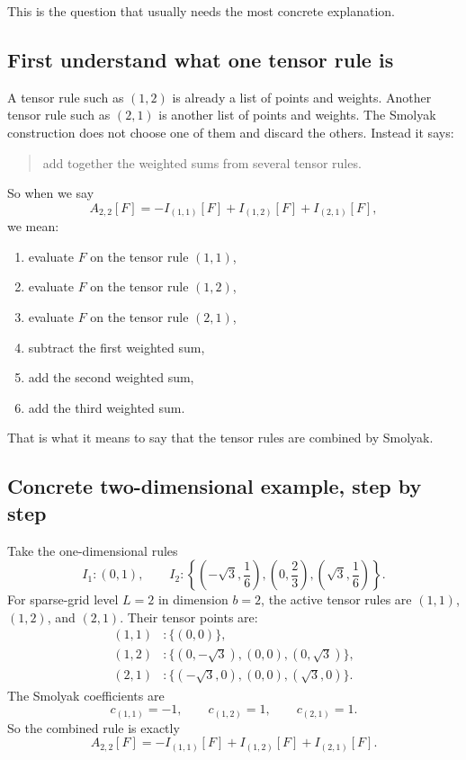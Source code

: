 \documentclass[11pt]{article}
\begin{document}
This is the question that usually needs the most concrete explanation.

\subsection{First understand what one tensor rule is}

A tensor rule such as \((1,2)\) is already a list of points and weights.
Another tensor rule such as \((2,1)\) is another list of points and weights.
The Smolyak construction does not choose one of them and discard the others.
Instead it says:
\begin{quote}
add together the weighted sums from several tensor rules.
\end{quote}

So when we say
\begin{equation}
  A_{2,2}[F] = -I_{(1,1)}[F] + I_{(1,2)}[F] + I_{(2,1)}[F],
  \label{eq:2d-smolyak}
\end{equation}
we mean:
\begin{enumerate}[leftmargin=0.28in]
  \item evaluate \(F\) on the tensor rule \((1,1)\),
  \item evaluate \(F\) on the tensor rule \((1,2)\),
  \item evaluate \(F\) on the tensor rule \((2,1)\),
  \item subtract the first weighted sum,
  \item add the second weighted sum,
  \item add the third weighted sum.
\end{enumerate}
That is what it means to say that the tensor rules are combined by Smolyak.

\subsection{Concrete two-dimensional example, step by step}

Take the one-dimensional rules
\begin{equation}
  I_1:(0,1),
  \qquad
  I_2:
  \left\{\left(-\sqrt3,\frac16\right),\left(0,\frac23\right),
  \left(\sqrt3,\frac16\right)\right\}.
  \label{eq:2d-univariate-rules}
\end{equation}
For sparse-grid level \(L=2\) in dimension \(b=2\), the active tensor rules are
\((1,1)\), \((1,2)\), and \((2,1)\).  Their tensor points are:
\begin{align}
  (1,1) &: \{(0,0)\},
  \label{eq:rule11-set}\\
  (1,2) &: \{(0,-\sqrt3),(0,0),(0,\sqrt3)\},
  \label{eq:rule12-set}\\
  (2,1) &: \{(-\sqrt3,0),(0,0),(\sqrt3,0)\}.
  \label{eq:rule21-set}
\end{align}
The Smolyak coefficients are
\begin{equation}
  c_{(1,1)}=-1,
  \qquad
  c_{(1,2)}=1,
  \qquad
  c_{(2,1)}=1.
  \label{eq:2d-smolyak-coeffs}
\end{equation}
So the combined rule is exactly
\begin{equation}
  A_{2,2}[F] = -I_{(1,1)}[F] + I_{(1,2)}[F] + I_{(2,1)}[F].
  \label{eq:2d-smolyak-repeat}
\end{equation}
\end{document}
